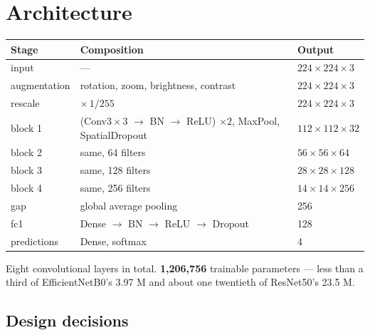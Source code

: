 \documentclass[11pt,a4paper]{article}
\begin{document}
\section{Architecture}

\begin{tabularx}{\linewidth}{@{}>{\ttfamily}p{3.6cm}p{4.4cm}X@{}}
\toprule
\textnormal{\bfseries Stage} & \textbf{Composition} & \textbf{Output} \\
\midrule
input       & --- & $224 \times 224 \times 3$ \\
augmentation & rotation, zoom, brightness, contrast & $224 \times 224 \times 3$ \\
rescale     & $\times\,1/255$ & $224 \times 224 \times 3$ \\
block 1     & (Conv$3{\times}3$ $\to$ BN $\to$ ReLU) $\times 2$, MaxPool, SpatialDropout & $112 \times 112 \times 32$ \\
block 2     & same, 64 filters  & $56 \times 56 \times 64$ \\
block 3     & same, 128 filters & $28 \times 28 \times 128$ \\
block 4     & same, 256 filters & $14 \times 14 \times 256$ \\
gap         & global average pooling & 256 \\
fc1         & Dense $\to$ BN $\to$ ReLU $\to$ Dropout & 128 \\
predictions & Dense, softmax & 4 \\
\bottomrule
\end{tabularx}

Eight convolutional layers in total. \textbf{1,206,756} trainable parameters --- less
than a third of EfficientNetB0's 3.97 M and about one twentieth of ResNet50's 23.5 M.

\subsection{Design decisions}
\end{document}
